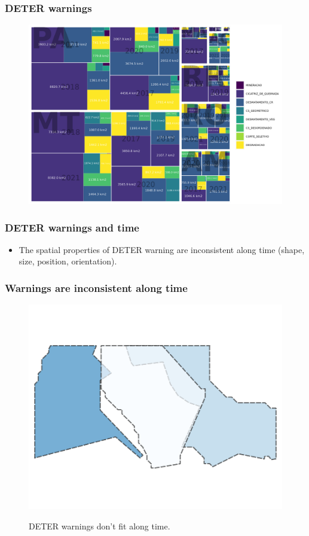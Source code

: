 \documentclass[aspectratio=169]{beamer}
\begin{document}
\begin{frame}
    \frametitle{DETER warnings}
    \begin{figure}[h] 
        \includegraphics[width=0.75\linewidth]
        {./figures/plot_deter_area_by_state_pyear_type.png}
        \label{fig:deter_area_state_pyear_type}
    \end{figure}
\end{frame}

\begin{frame}
    \frametitle{DETER warnings and time}
    \begin{itemize}
        \item The spatial properties of DETER warning are inconsistent along 
            time (shape, size, position, orientation).
    \end{itemize}
\end{frame}

\begin{frame}
    \frametitle{Warnings are inconsistent along time}
    \begin{figure}[h] 
        \includegraphics[width=0.60\linewidth]
        {./images/sample_deter_warnings.png}
        \label{fig:deter_subareas}
        \caption{DETER warnings don't fit along time.}
    \end{figure}
\end{frame}
\end{document}
